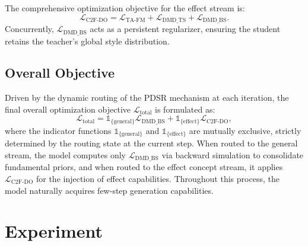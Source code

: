 \documentclass{llmxive}
\begin{document}
The comprehensive optimization objective for the effect stream is:
\begin{equation}
\mathcal{L}_{\text{C2F-DO}} = \mathcal{L}_{\text{TA-FM}} + \mathcal{L}_{\text{DMD\_TS}} + \mathcal{L}_{\text{DMD\_BS}}.
\end{equation}
Concurrently, $\mathcal{L}_{\text{DMD\_BS}}$ acts as a persistent regularizer, ensuring the student retains the teacher's global style distribution.


\subsection{Overall Objective}\label{method:4_5}
Driven by the dynamic routing of the PDSR mechanism at each iteration, the final overall optimization objective $\mathcal{L}_{\text{total}}$ is formulated as:
\begin{equation}
\mathcal{L}_{\text{total}} = \mathbb{1}_{\{\text{general}\}} \mathcal{L}_{\text{DMD\_BS}} + \mathbb{1}_{\{\text{effect}\}} \mathcal{L}_{\text{C2F-DO}},
\end{equation}
where the indicator functions $\mathbb{1}_{\{\text{general}\}}$ and $\mathbb{1}_{\{\text{effect}\}}$ are mutually exclusive, strictly determined by the routing state at the current step.
When routed to the general stream, the model computes only $\mathcal{L}_{\text{DMD\_BS}}$ via backward simulation to consolidate fundamental priors, and when routed to the effect concept stream, it applies $\mathcal{L}_{\text{C2F-DO}}$ for the injection of effect capabilities. Throughout this process, the model naturally acquires few-step generation capabilities.

\section{Experiment}
\label{sec:exp}

\vspace{-0.1cm}
\end{document}
